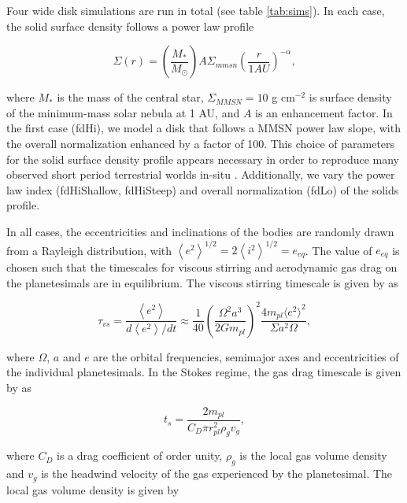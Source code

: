 \documentclass[twocolumn]{aastex63}
\begin{document}
Four wide disk simulations are run in total (see table \ref{tab:sims}). In each case, the solid surface density follows a power law profile

\begin{equation}
	\Sigma(r) = \left( \frac{M_{*}}{M_{\odot}} \right) A \Sigma_{mmsn} \left( \frac{r}{1 AU} \right)^{-\alpha},
\end{equation}

\noindent where $M_{*}$ is the mass of the central star, $\Sigma_{MMSN} = 10$ g cm$^{-2}$ is surface density of the minimum-mass solar nebula \citep{hayashi81} at 1 AU, and $A$ is an enhancement factor. In the first case (fdHi), we model a disk that follows a MMSN power law slope, with the overall normalization enhanced by a factor of 100. This choice of parameters for the solid surface density profile appears necessary in order to reproduce many observed short period terrestrial worlds in-situ \citep{hansen12}. Additionally, we vary the power law index (fdHiShallow, fdHiSteep) and overall normalization (fdLo) of the solids profile.

In all cases, the eccentricities and inclinations of the bodies are randomly drawn from a Rayleigh distribution, with $\left< e^{2} \right>^{1/2} = 2\left<i^{2} \right>^{1/2} = e_{eq}$. The value of $e_{eq}$ is chosen such that the timescales for viscous stirring and aerodynamic gas drag on the planetesimals are in equilibrium. The viscous stirring timescale is given by \citet{ida93} as

\begin{equation}\label{eq:vs_timescale}
    \tau_{vs}  = \frac{\left< e^2 \right>}{d \left< e^2 \right> / dt} \approx \frac{1}{40}\left(\frac{\Omega^{2} a^{3}}{2 G m_{pl}}\right)^{2} \frac{4 m_{pl} \langle e^{2} \rangle^{2}}{\Sigma a^{2} \Omega},
\end{equation}

\noindent where $\Omega$, $a$ and $e$ are the orbital frequencies, semimajor axes and eccentricities of the individual planetesimals. In the Stokes regime, the gas drag timescale is given by \citet{adachi76} as

\begin{equation}\label{eq:ts_stokes}
    t_{s} = \frac{2 m_{pl}}{C_{D} \pi r_{pl}^{2} \rho_{g} v_{g}},
\end{equation}

\noindent where $C_{D}$ is a drag coefficient of order unity, $\rho_{g}$ is the local gas volume density and $v_{g}$ is the headwind velocity of the gas experienced by the planetesimal. The local gas volume density is given by
\end{document}
